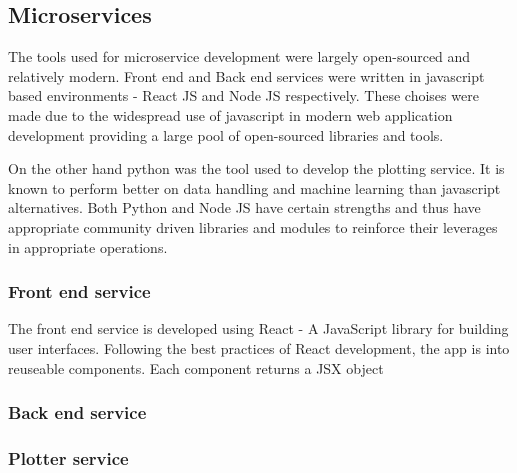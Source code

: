 \documentclass[a4paper,12pt,fleqn]{article}
\begin{document}
\subsection{Microservices}
The tools used for microservice development were largely open-sourced and relatively modern. 
Front end and Back end services were written in javascript  
based environments - React JS and Node JS respectively.
These choises were made due to the widespread use of javascript in modern web application development providing a large pool of open-sourced libraries and tools.

On the other hand python was the tool used to develop the plotting service. It is known to perform better on data handling and machine learning than javascript alternatives. \cite{javascript_vs_python_ml}
Both Python and Node JS have certain strengths and thus have appropriate community driven libraries and modules to reinforce their leverages in appropriate operations.

\subsubsection{Front end service}
The front end service is developed using React - A JavaScript library for building user interfaces. \cite{react_home}
Following the best practices of React development, the app is into reuseable components. Each component returns a JSX object



\subsubsection{Back end service}
\subsubsection{Plotter service}








\end{document}
